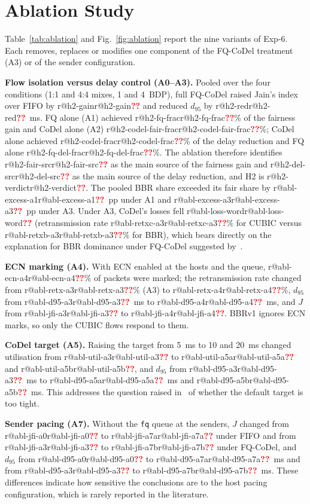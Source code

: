 \documentclass[conference]{IEEEtran}
\makeatletter
\newcommand{\R}[1]{\ifcsname r@#1\endcsname\csname r@#1\endcsname\else\textcolor{red}{\textbf{??}}\fi}
\newcommand{\dq}[1]{d_{#1}}
\makeatother
\begin{document}
\section{Ablation Study}
\label{sec:ablation}

Table~\ref{tab:ablation} and Fig.~\ref{fig:ablation} report the nine variants of Exp-6. Each removes, replaces or modifies one component of the FQ-CoDel treatment (A3) or of the sender configuration.

\textbf{Flow isolation versus delay control (A0--A3).} Pooled over the four conditions (1:1 and 4:4 mixes, 1 and 4~BDP), full FQ-CoDel raised Jain's index over FIFO by \R{h2-gain} and reduced $\dq{95}$ by \R{h2-red}~ms. FQ alone (A1) achieved \R{h2-fq-frac}\% of the fairness gain and CoDel alone (A2) \R{h2-codel-fair-frac}\%; CoDel alone achieved \R{h2-codel-frac}\% of the delay reduction and FQ alone \R{h2-fq-del-frac}\%. The ablation therefore identifies \R{h2-fair-src} as the main source of the fairness gain and \R{h2-del-src} as the main source of the delay reduction, and H2 is \R{h2-verdict}. The pooled BBR share exceeded its fair share by \R{abl-excess-a1}~pp under A1 and \R{abl-excess-a3}~pp under A3. Under A3, CoDel's losses fell \R{abl-loss-word} (retransmission rate \R{abl-retxc-a3}\% for CUBIC versus \R{abl-retxb-a3}\% for BBR), which bears directly on the explanation for BBR dominance under FQ-CoDel suggested by~\cite{shrestha2025wifi}.

\textbf{ECN marking (A4).} With ECN enabled at the hosts and the queue, \R{abl-ecn-a4}\% of packets were marked; the retransmission rate changed from \R{abl-retx-a3}\% (A3) to \R{abl-retx-a4}\%, $\dq{95}$ from \R{abl-d95-a3}~ms to \R{abl-d95-a4}~ms, and $J$ from \R{abl-jfi-a3} to \R{abl-jfi-a4}. BBRv1 ignores ECN marks, so only the CUBIC flows respond to them.

\textbf{CoDel target (A5).} Raising the target from 5~ms to 10 and 20~ms changed utilisation from \R{abl-util-a3} to \R{abl-util-a5a} and \R{abl-util-a5b}, and $\dq{95}$ from \R{abl-d95-a3}~ms to \R{abl-d95-a5a}~ms and \R{abl-d95-a5b}~ms. This addresses the question raised in~\cite{kumari2025cubic} of whether the default target is too tight.

\textbf{Sender pacing (A7).} Without the \texttt{fq} queue at the senders, $J$ changed from \R{abl-jfi-a0} to \R{abl-jfi-a7a} under FIFO and from \R{abl-jfi-a3} to \R{abl-jfi-a7b} under FQ-CoDel, and $\dq{95}$ from \R{abl-d95-a0} to \R{abl-d95-a7a}~ms and from \R{abl-d95-a3} to \R{abl-d95-a7b}~ms. These differences indicate how sensitive the conclusions are to the host pacing configuration, which is rarely reported in the literature.
\end{document}
